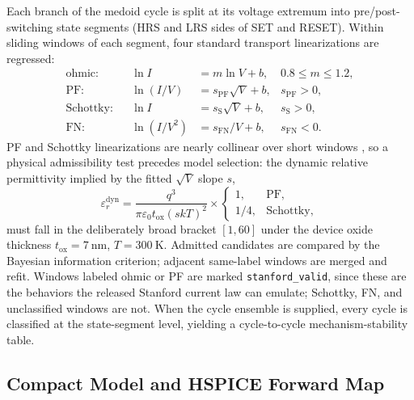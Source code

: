 \documentclass[journal]{IEEEtran}
\begin{document}
Each branch of the medoid cycle is split at its voltage extremum into
pre/post-switching state segments (HRS and LRS sides of SET and RESET).
Within sliding windows of each segment, four standard transport
linearizations are regressed:
\begin{align}
  \text{ohmic:} &&
  \ln I &= m\ln V + b, &
  0.8 \le m \le 1.2, \label{eq:ohmic}\\
  \text{PF:} &&
  \ln(I/V) &= s_{\mathrm{PF}}\sqrt{V}+b, &
  s_{\mathrm{PF}}>0, \label{eq:pf}\\
  \text{Schottky:} &&
  \ln I &= s_{\mathrm{S}}\sqrt{V}+b, &
  s_{\mathrm{S}}>0, \label{eq:schottky}\\
  \text{FN:} &&
  \ln(I/V^2) &= s_{\mathrm{FN}}/V+b, &
  s_{\mathrm{FN}}<0. \label{eq:fn}
\end{align}
PF and Schottky linearizations are nearly collinear over short windows
\cite{chiu2014}, so a physical admissibility test precedes model selection:
the dynamic relative permittivity implied by the fitted $\sqrt{V}$ slope $s$,
\begin{equation}
  \varepsilon_r^{\mathrm{dyn}}
  =
  \frac{q^3}{\pi\varepsilon_0 t_{\mathrm{ox}}(s kT)^2}
  \times
  \begin{cases}
    1, & \mathrm{PF},\\
    1/4, & \mathrm{Schottky},
  \end{cases}
  \label{eq:eps-dyn}
\end{equation}
must fall in the deliberately broad bracket $[1,60]$ under the device oxide
thickness $t_{\mathrm{ox}}=\SI{7}{\nano\meter}$, $T=\SI{300}{\kelvin}$.
Admitted
candidates are compared by the Bayesian information criterion; adjacent
same-label windows are merged and refit.  Windows labeled ohmic or PF are
marked \texttt{stanford\_valid}, since these are the behaviors the released
Stanford current law can emulate; Schottky, FN, and unclassified windows are
not.  When the cycle ensemble is supplied, every cycle is classified at the
state-segment level, yielding a cycle-to-cycle mechanism-stability table.

\subsection{Compact Model and HSPICE Forward Map}
\label{sec:model}
\end{document}
